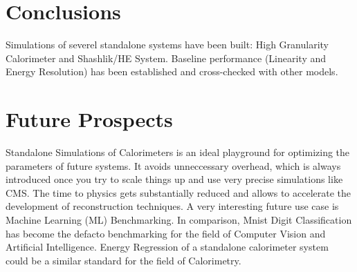 \section{Conclusions} \label{section:simulations_conclusions}
Simulations of severel standalone systems have been built: High Granularity Calorimeter and Shashlik/HE System. Baseline performance (Linearity and Energy Resolution) has been established and cross-checked with other models. %

\section{Future Prospects}
Standalone Simulations of Calorimeters is an ideal playground for optimizing the parameters of future systems. It avoids unneccessary overhead, which is always introduced once you try to scale things up and use very precise simulations like CMS. The time to physics gets substantially reduced and allows to accelerate the development of reconstruction techniques. A very interesting future use case is Machine Learning (ML) Benchmarking. In comparison, Mnist Digit Classification has become the defacto benchmarking for the field of Computer Vision and Artificial Intelligence. Energy Regression of a standalone calorimeter system could be a similar standard for the field of Calorimetry.